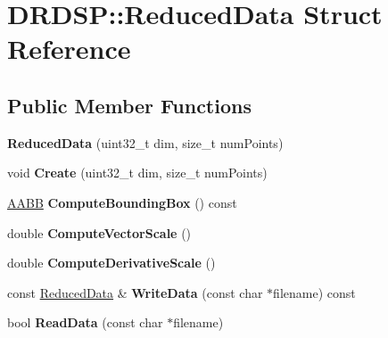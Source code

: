 \hypertarget{struct_d_r_d_s_p_1_1_reduced_data}{\section{D\-R\-D\-S\-P\-:\-:Reduced\-Data Struct Reference}
\label{struct_d_r_d_s_p_1_1_reduced_data}
}
\subsection*{Public Member Functions}
\begin{DoxyCompactItemize}
\item 
\hypertarget{struct_d_r_d_s_p_1_1_reduced_data_a8f35a3fffafac8f425b42094dbd0f855}{{\bfseries Reduced\-Data} (uint32\-\_\-t dim, size\-\_\-t num\-Points)}\label{struct_d_r_d_s_p_1_1_reduced_data_a8f35a3fffafac8f425b42094dbd0f855}

\item 
\hypertarget{struct_d_r_d_s_p_1_1_reduced_data_a7dbdf538537a79f996da1229f442441f}{void {\bfseries Create} (uint32\-\_\-t dim, size\-\_\-t num\-Points)}\label{struct_d_r_d_s_p_1_1_reduced_data_a7dbdf538537a79f996da1229f442441f}

\item 
\hypertarget{struct_d_r_d_s_p_1_1_reduced_data_ae8d15e5d1a61ed5e495112e4941b9ecb}{\hyperlink{struct_d_r_d_s_p_1_1_a_a_b_b}{A\-A\-B\-B} {\bfseries Compute\-Bounding\-Box} () const }\label{struct_d_r_d_s_p_1_1_reduced_data_ae8d15e5d1a61ed5e495112e4941b9ecb}

\item 
\hypertarget{struct_d_r_d_s_p_1_1_reduced_data_a603dadcceb2b793a76851ec687adad12}{double {\bfseries Compute\-Vector\-Scale} ()}\label{struct_d_r_d_s_p_1_1_reduced_data_a603dadcceb2b793a76851ec687adad12}

\item 
\hypertarget{struct_d_r_d_s_p_1_1_reduced_data_a6b5e802882a81572f3db17e5d1b0afa2}{double {\bfseries Compute\-Derivative\-Scale} ()}\label{struct_d_r_d_s_p_1_1_reduced_data_a6b5e802882a81572f3db17e5d1b0afa2}

\item 
\hypertarget{struct_d_r_d_s_p_1_1_reduced_data_ac28e917c0265bad1d4bb85c53629f8c5}{const \hyperlink{struct_d_r_d_s_p_1_1_reduced_data}{Reduced\-Data} \& {\bfseries Write\-Data} (const char $\ast$filename) const }\label{struct_d_r_d_s_p_1_1_reduced_data_ac28e917c0265bad1d4bb85c53629f8c5}

\item 
\hypertarget{struct_d_r_d_s_p_1_1_reduced_data_a0eedb12f1ca3d0775d10472f491fc72b}{bool {\bfseries Read\-Data} (const char $\ast$filename)}\label{struct_d_r_d_s_p_1_1_reduced_data_a0eedb12f1ca3d0775d10472f491fc72b}


\end{DoxyCompactItemize}

